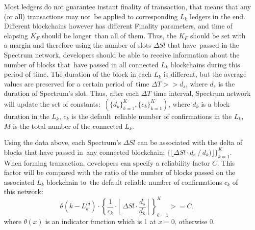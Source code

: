 Most ledgers do not guarantee instant finality of transaction, that means that any (or all) transactions may not\
be applied to corresponding $L_k$ ledgers in the end.
Different blockchains however has different Finality parameters, and time of elapsing $K_F$ should be longer\
than all of them.
Thus, the $K_F$ should be set with a margin and therefore using the number of slots $\Delta Sl$ that have\
passed in the Spectrum network, developers should be able to receive information about the number of blocks that\
have passed in all connected $L_k$ blockchains during this period of time.
The duration of the block in each $L_k$ is different, but the average values are preserved for a certain period of\
time ${\Delta T >> d_s}$, where $d_s$ is the duration of Spectrum's slot.
Thus, after each $\Delta T$ time interval, Spectrum network will update the set of constants:\
${(\{d_{k}\}_{k=1}^{K},\{c_{k}\}_{k=1}^{K})}$, where $d_k$ is a block duration in the $L_k$, $c_k$ is the default\
reliable number of confirmations in the $L_k$, $M$ is the total number of the connected $L_k$.

Using the data above, each Spectrum's $\Delta Sl$ can be associated with the delta of blocks that have passed in\
any connected blockchain: ${\{\lfloor \Delta Sl \cdot d_s \mathbin{/} d_k)\rfloor\}_{k=1}^{K}}$.
When forming transaction, developers can specify a reliability factor $C$.
This factor will be compared with the ratio of the number of blocks passed on the associated $L_k$ blockchain to\
the default reliable number of confirmations $c_k$ of this network:
\begin{equation}
    \theta(k-L_k^{id})\cdot \left\{\frac{1}{c_k} \cdot \left\lfloor \Delta Sl \cdot
    \frac{d_s}{d_k}\right\rfloor\right\}_{k=1}^{K} >= C,\label{eq:equation2}
\end{equation}
where $\theta(x)$ is an indicator function which is 1 at $x = 0$, otherwise 0.
